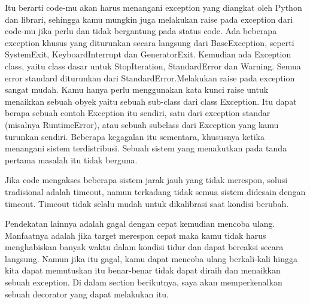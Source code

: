 Itu berarti code-mu akan harus menangani exception yang diangkat oleh Python dan librari, sehingga kamu mungkin juga melakukan raise pada exception dari code-mu jika perlu dan tidak bergantung pada status code.
Ada beberapa exception khusus yang diturunkan secara langsung dari BaseException, seperti SystemExit, KeyboardInterrupt dan GeneratorExit. Kemudian ada Exception class, yaitu class dasar untuk StopIteration, StandardError dan Warning. Semua error standard diturunkan dari StandardError.Melakukan raise pada exception sangat mudah. Kamu hanya perlu menggunakan kata kunci raise untuk menaikkan sebuah obyek yaitu sebuah sub-class dari class Exception. Itu dapat berapa sebuah contoh Exception itu sendiri, satu dari exception standar (misalnya RuntimeError), atau sebuah subclass dari Exception yang kamu turunkan sendiri.
Beberapa kegagalan itu sementara, khususnya ketika menangani sistem terdistribusi. Sebuah sistem yang menakutkan pada tanda pertama masalah itu tidak berguna.

Jika code mengakses beberapa sistem jarak jauh yang tidak merespon, solusi tradisional adalah timeout, namun terkadang tidak semua sistem didesain dengan timeout. Timeout tidak selalu mudah untuk dikalibrasi saat kondisi berubah.

Pendekatan lainnya adalah gagal dengan cepat kemudian mencoba ulang. Manfaatnya adalah jika target merespon cepat maka kamu tidak harus menghabiskan banyak waktu dalam kondisi tidur dan dapat bereaksi secara langsung. Namun jika itu gagal, kamu dapat mencoba ulang berkali-kali hingga kita dapat memutuskan itu benar-benar tidak dapat diraih dan menaikkan sebuah exception. Di dalam section berikutnya, saya akan memperkenalkan sebuah decorator yang dapat melakukan itu.

 